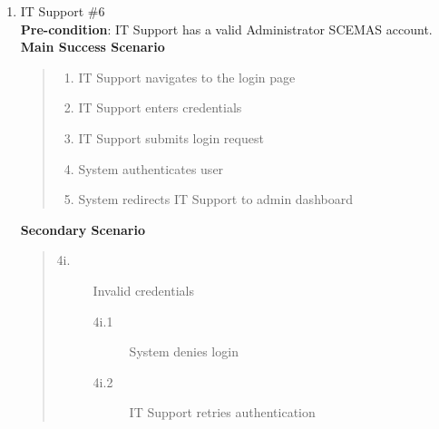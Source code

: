 \documentclass[]{article}
\begin{document}
\begin{enumerate}[{\bf BE10.}]
\begin{enumerate}[{\bf VP1.}]
            \item IT Support \#6\\
                \textbf{Pre-condition}: IT Support has a valid Administrator SCEMAS account.\\
                \textbf{Main Success Scenario}
                \begin{quote}
                    \begin{enumerate}[1.]
                        \item IT Support navigates to the login page
                        \item IT Support enters credentials
                        \item IT Support submits login request
                        \item System authenticates user
                        \item System redirects IT Support to admin dashboard
                    \end{enumerate}
                \end{quote}
                \textbf{Secondary Scenario}
                \begin{quote}
                    \begin{description}
                        \item[\textmd{4i.}] Invalid credentials
                        \begin{description}
                            \item[\textmd{4i.1}] System denies login
                            \item[\textmd{4i.2}] IT Support retries authentication
                        \end{description}
                    \end{description}
                \end{quote}
        \end{enumerate}


\end{enumerate}
\end{document}
